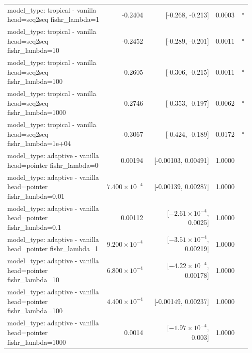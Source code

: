 \documentclass[10pt]{article}
\makeatletter
\newcommand{\stackcell}[1]{\begin{tabular}[t]{@{}l@{}}#1\end{tabular}}
\makeatother
\begin{document}
{\begin{longtable}{lrrrl}
\stackcell{model\_type: tropical - vanilla\\\footnotesize head=seq2seq fishr\_lambda=1 } & -0.2404 & [-0.268, -0.213] & 0.0003 & *\\
\stackcell{model\_type: tropical - vanilla\\\footnotesize head=seq2seq fishr\_lambda=10 } & -0.2452 & [-0.289, -0.201] & 0.0011 & *\\
\stackcell{model\_type: tropical - vanilla\\\footnotesize head=seq2seq fishr\_lambda=100 } & -0.2605 & [-0.306, -0.215] & 0.0011 & *\\
\stackcell{model\_type: tropical - vanilla\\\footnotesize head=seq2seq fishr\_lambda=1000 } & -0.2746 & [-0.353, -0.197] & 0.0062 & *\\
\stackcell{model\_type: tropical - vanilla\\\footnotesize head=seq2seq fishr\_lambda=1e+04 } & -0.3067 & [-0.424, -0.189] & 0.0172 & *\\
\stackcell{model\_type: adaptive - vanilla\\\footnotesize head=pointer fishr\_lambda=0 } & 0.00194 & [-0.00103, 0.00491] & 1.0000 & \\
\stackcell{model\_type: adaptive - vanilla\\\footnotesize head=pointer fishr\_lambda=0.01 } & $7.400\times10^{-4}$ & [-0.00139, 0.00287] & 1.0000 & \\
\stackcell{model\_type: adaptive - vanilla\\\footnotesize head=pointer fishr\_lambda=0.1 } & 0.00112 & [$-2.61\times10^{-4}$, 0.0025] & 1.0000 & \\
\stackcell{model\_type: adaptive - vanilla\\\footnotesize head=pointer fishr\_lambda=1 } & $9.200\times10^{-4}$ & [$-3.51\times10^{-4}$, 0.00219] & 1.0000 & \\
\stackcell{model\_type: adaptive - vanilla\\\footnotesize head=pointer fishr\_lambda=10 } & $6.800\times10^{-4}$ & [$-4.22\times10^{-4}$, 0.00178] & 1.0000 & \\
\stackcell{model\_type: adaptive - vanilla\\\footnotesize head=pointer fishr\_lambda=100 } & $4.400\times10^{-4}$ & [-0.00149, 0.00237] & 1.0000 & \\
\stackcell{model\_type: adaptive - vanilla\\\footnotesize head=pointer fishr\_lambda=1000 } & 0.0014 & [$-1.97\times10^{-4}$, 0.003] & 1.0000 & \\

\end{longtable}}
\end{document}
